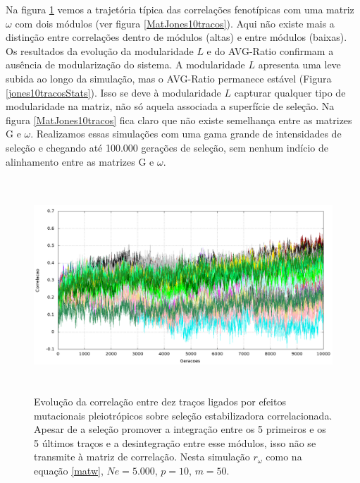 Na figura \ref{jones10tracos} vemos a trajetória típica das correlações
fenotípicas com uma matriz $\omega$ com dois módulos (ver figura
\ref{MatJones10tracos}).  
Aqui não existe mais a distinção entre
correlações dentro de módulos (altas) e entre módulos (baixas). 
Os resultados da evolução da modularidade $L$ e do AVG-Ratio confirmam a
ausência de modularização do sistema. 
A modularidade $L$ apresenta uma leve subida ao longo da simulação, mas
o AVG-Ratio permanece estável (Figura \ref{jones10tracosStats}). 
Isso se deve à modularidade $L$ capturar qualquer tipo de modularidade
na matriz, não só aquela associada a superfície de seleção. 
Na figura \ref{MatJones10tracos} fica claro que não existe semelhança
entre as matrizes G e $\omega$. 
Realizamos essas simulações com uma gama grande de intensidades de
seleção e chegando até 100.000 gerações de seleção, sem nenhum indício de
alinhamento entre as matrizes G e $\omega$.  


\begin{figure}[htbp]
  \centering
  \includegraphics[width=150mm, height=80mm]{figuras/jones10tracos.png}
  \caption{Evolução da correlação entre dez traços ligados por efeitos
  mutacionais pleiotrópicos sobre seleção estabilizadora
  correlacionada. Apesar de a seleção promover a integração entre os
  5 primeiros e os 5 últimos traços e a desintegração entre esse
  módulos, isso não se transmite à matriz de correlação. Nesta simulação
  $r_\omega$ como na equação \ref{matw}, $Ne=5.000$, $p=10$, $m=50$.}
  \label{jones10tracos}
\end{figure}



